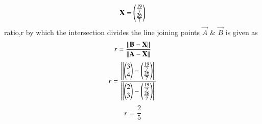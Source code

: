 \documentclass[journal,12pt,twocolumn]{IEEEtran}
\begin{document}
\begin{equation}
\mathbf{X} = \begin{pmatrix}\frac{19}{7}\\\frac{26}{7}\end{pmatrix} \label{10}    
\end{equation}
ratio,r by which the intersection divides the line joining points $\vec{A}$ \& $\vec{B}$ is given as
\begin{equation}
r = \frac{\left\lVert\mathbf{B} -\mathbf{X}\right\rVert}{\left\lVert\mathbf{A} -\mathbf{X}\right\rVert} \label{11}
\end{equation}
\begin{equation}
r = \frac{\left\lVert\begin{pmatrix}3\\4\end{pmatrix} -\begin{pmatrix}\frac{19}{7}\\ \frac{26}{7}\end{pmatrix}\right\rVert}{\left\lVert\begin{pmatrix}2\\3\end{pmatrix} -\begin{pmatrix}\frac{19}{7}\\\frac{26}{7}\end{pmatrix}\right\rVert} \label{12}   
\end{equation}
\begin{equation}
r = \frac{2}{5} \label{13}   
\end{equation}
\end{document}
